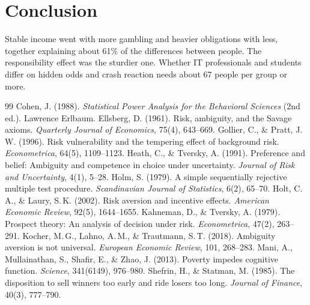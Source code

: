 \documentclass[10pt,a4paper]{article}
\begin{document}
\section{Conclusion}

Stable income went with more gambling and heavier obligations with less, together explaining about 61\% of the differences between people. The responsibility effect was the sturdier one. Whether IT professionals and students differ on hidden odds and crash reaction needs about 67 people per group or more.

\begin{thebibliography}{99}
\footnotesize\setlength{\itemsep}{0pt}
 Cohen, J. (1988). \emph{Statistical Power Analysis for the Behavioral Sciences} (2nd ed.). Lawrence Erlbaum.
 Ellsberg, D. (1961). Risk, ambiguity, and the Savage axioms. \emph{Quarterly Journal of Economics}, 75(4), 643--669.
 Gollier, C., \& Pratt, J.\,W. (1996). Risk vulnerability and the tempering effect of background risk. \emph{Econometrica}, 64(5), 1109--1123.
 Heath, C., \& Tversky, A. (1991). Preference and belief: Ambiguity and competence in choice under uncertainty. \emph{Journal of Risk and Uncertainty}, 4(1), 5--28.
 Holm, S. (1979). A simple sequentially rejective multiple test procedure. \emph{Scandinavian Journal of Statistics}, 6(2), 65--70.
 Holt, C.\,A., \& Laury, S.\,K. (2002). Risk aversion and incentive effects. \emph{American Economic Review}, 92(5), 1644--1655.
 Kahneman, D., \& Tversky, A. (1979). Prospect theory: An analysis of decision under risk. \emph{Econometrica}, 47(2), 263--291.
 Kocher, M.\,G., Lahno, A.\,M., \& Trautmann, S.\,T. (2018). Ambiguity aversion is not universal. \emph{European Economic Review}, 101, 268--283.
 Mani, A., Mullainathan, S., Shafir, E., \& Zhao, J. (2013). Poverty impedes cognitive function. \emph{Science}, 341(6149), 976--980.
 Shefrin, H., \& Statman, M. (1985). The disposition to sell winners too early and ride losers too long. \emph{Journal of Finance}, 40(3), 777--790.
\end{thebibliography}
\end{document}
